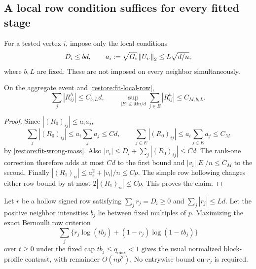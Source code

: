 \subsection{A local row condition suffices for every fitted stage}

For a tested vertex $i$, impose only the local conditions
\begin{equation}\label{restore:fit-local-row}
 D_i\le bd,\qquad
 a_i:=\sqrt{G_i}\left\lVert U_{i\cdot}\right\rVert_2\le L\sqrt{d/n},
\end{equation}
where $b,L$ are fixed. These are not imposed on every neighbor
simultaneously.

\begin{lemma}
\label{restore:fit-local-mass}
On the aggregate event and \eqref{restore:fit-local-row},
\begin{equation}\label{restore:fit-local-mass-bounds}
 \sum_j|R^h_{ij}|\le C_{b,L}d,\qquad
 \sup_{|E|\le Mn/d}\sum_{j\in E}|R^h_{ij}|\le C_{M,b,L}.
\end{equation}
\end{lemma}

\begin{proof}
Since $|(R_0)_{ij}|\le a_ia_j$,
\[
 \sum_j|(R_0)_{ij}|\le a_i\sum_j a_j\le Cd,\qquad
 \sum_{j\in E}|(R_0)_{ij}|
       \le a_i\sum_{j\in E}a_j\le C_M
\]
by \cref{restore:fit-wrong-mass}. Also
$|v_i|\le D_i+\sum_j|(R_0)_{ij}|\le Cd$.
The rank-one correction therefore adds at most $Cd$ to the first
bound and $|v_i||E|/n\le C_M$ to the second.
Finally $|(R_1)_{ii}|\le a_i^2+|v_i|/n\le Cp$.
The simple row hollowing changes either row bound by at most
$2|(R_1)_{ii}|\le Cp$. This proves the claim.
\end{proof}

\begin{lemma}
\label{restore:fit-profile}
Let $r$ be a hollow signed row satisfying
$\sum_jr_j=D_i\ge0$ and $\sum_j|r_j|\le Ld$.
Let the positive neighbor intensities $b_j$ lie between fixed
multiples of $p$. Maximizing the exact Bernoulli row criterion
\[
 \sum_j\{r_j\log(tb_j)+(1-r_j)\log(1-tb_j)\}
\]
over $t\ge0$ under the fixed cap $tb_j\le q_{\max}<1$ gives the
usual normalized block-profile contrast, with remainder $O(np^2)$.
No entrywise bound on $r_j$ is required.
\end{lemma}

